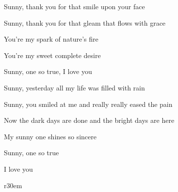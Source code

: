 \begin{song}
\bigskip

Sunny,  thank you for that smile upon your face  \par
{}Sunny,  thank you for that gleam that flows with grace  \par
{}You're my spark of nature's fire \par
{}You're my sweet complete desire \par
{}Sunny, one so true, I love you  \par

\bigskip

Sunny,  yesterday all my  life was filled with rain  \par
{}Sunny,  you smiled at me and really really eased the pain  \par
Now the dark days are done and the bright days are here \par
{}My sunny one shines so sincere \par
{}Sunny, one so true \par

\bigskip

 \par
I love you   \par

\small

\begin{wrapfigure}{r}{30em}
\vspace{-3.5em} %
\centering
{}
\par
\par
\end{wrapfigure}

\ %

\bigskip


\bigskip

\end{song}
